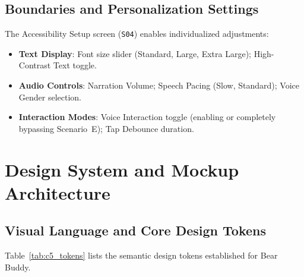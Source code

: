 \subsection{Boundaries and Personalization Settings}

The Accessibility Setup screen (\texttt{S04}) enables individualized adjustments:
\begin{itemize}
    \item \textbf{Text Display}: Font size slider (Standard, Large, Extra Large); High-Contrast Text toggle.
    \item \textbf{Audio Controls}: Narration Volume; Speech Pacing (Slow, Standard); Voice Gender selection.
    \item \textbf{Interaction Modes}: Voice Interaction toggle (enabling or completely bypassing Scenario~E); Tap Debounce duration.
\end{itemize}

\section{Design System and Mockup Architecture}

\subsection{Visual Language and Core Design Tokens}

Table~\ref{tab:c5_tokens} lists the semantic design tokens established for Bear Buddy.

